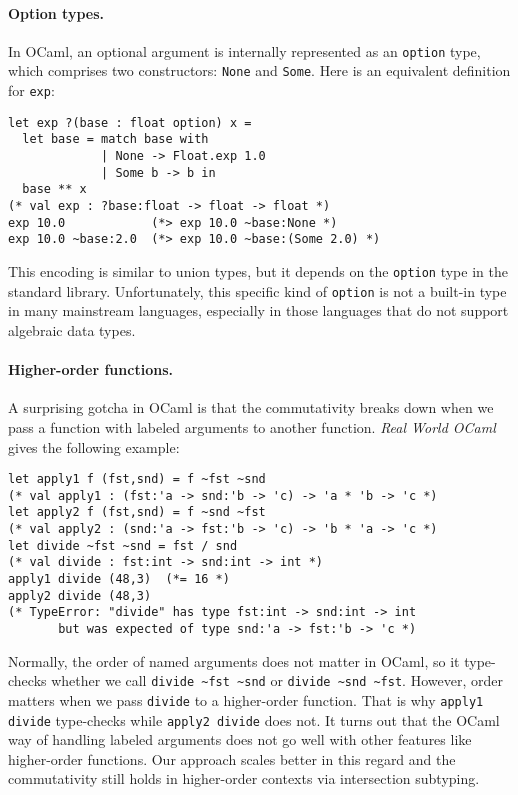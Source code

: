 \paragraph{Option types.}
In OCaml, an optional argument is internally represented as an \lstinline{option}
type, which comprises two constructors: \lstinline{None} and \lstinline{Some}.
Here is an equivalent definition for \lstinline{exp}:

\begin{lstlisting}[language={[Objective]Caml}]
let exp ?(base : float option) x =
  let base = match base with
             | None -> Float.exp 1.0
             | Some b -> b in
  base ** x
(* val exp : ?base:float -> float -> float *)
exp 10.0            (*> exp 10.0 ~base:None *)
exp 10.0 ~base:2.0  (*> exp 10.0 ~base:(Some 2.0) *)
\end{lstlisting}

\noindent This encoding is similar to union types, but it depends on the
\lstinline{option} type in the standard library. Unfortunately, this specific
kind of \lstinline{option} is not a built-in type in many mainstream languages,
especially in those languages that do not support algebraic data types.

\paragraph{Higher-order functions.}
A surprising gotcha in OCaml is that the commutativity breaks down when we pass
a function with labeled arguments to another function. \emph{Real World
OCaml}~\citep{madhavapeddy2022real} gives the following example:
\begin{lstlisting}[language={[Objective]Caml}]
let apply1 f (fst,snd) = f ~fst ~snd
(* val apply1 : (fst:'a -> snd:'b -> 'c) -> 'a * 'b -> 'c *)
let apply2 f (fst,snd) = f ~snd ~fst
(* val apply2 : (snd:'a -> fst:'b -> 'c) -> 'b * 'a -> 'c *)
let divide ~fst ~snd = fst / snd
(* val divide : fst:int -> snd:int -> int *)
apply1 divide (48,3)  (*= 16 *)
apply2 divide (48,3)
(* TypeError: "divide" has type fst:int -> snd:int -> int
       but was expected of type snd:'a -> fst:'b -> 'c *)
\end{lstlisting}
Normally, the order of named arguments does not matter in OCaml, so it
type-checks whether we call \lstinline{divide ~fst ~snd} or
\lstinline{divide ~snd ~fst}. However, order matters when we pass
\lstinline{divide} to a higher-order function. That is why
\lstinline{apply1 divide} type-checks while \lstinline{apply2 divide} does not.
It turns out that the OCaml way of handling labeled arguments does not go well
with other features like higher-order functions. Our approach scales better in
this regard and the commutativity still holds in higher-order contexts via
intersection subtyping.

